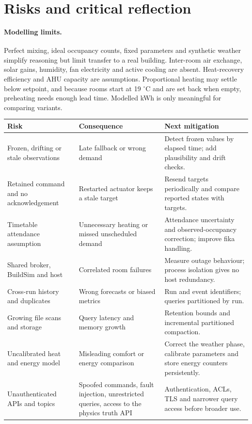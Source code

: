 \documentclass[11pt,a4paper]{article}
\begin{document}
\section{Risks and critical reflection}\label{sec:risks}
\paragraph{Modelling limits.}
Perfect mixing, ideal occupancy counts, fixed parameters and synthetic weather simplify reasoning but limit transfer to a real building. Inter-room air exchange, solar gains, humidity, fan electricity and active cooling are absent. Heat-recovery efficiency and AHU capacity are assumptions. Proportional heating may settle below setpoint, and because rooms start at 19 $^\circ$C and are set back when empty, preheating needs enough lead time. Modelled kWh is only meaningful for comparing variants.

{\small\begin{longtable}{>{\raggedright\arraybackslash}p{36mm}>{\raggedright\arraybackslash}p{52mm}>{\raggedright\arraybackslash}p{56mm}}\toprule Risk & Consequence & Next mitigation\\\midrule\endhead
Frozen, drifting or stale observations & Late fallback or wrong demand & Detect frozen values by elapsed time; add plausibility and drift checks.\\
Retained command and no acknowledgement & Restarted actuator keeps a stale target & Resend targets periodically and compare reported states with targets.\\
Timetable attendance assumption & Unnecessary heating or missed unscheduled demand & Attendance uncertainty and observed-occupancy correction; improve fika handling.\\
Shared broker, BuildSim and host & Correlated room failures & Measure outage behaviour; process isolation gives no host redundancy.\\
Cross-run history and duplicates & Wrong forecasts or biased metrics & Run and event identifiers; queries partitioned by run.\\
Growing file scans and storage & Query latency and memory growth & Retention bounds and incremental partitioned compaction.\\
Uncalibrated heat and energy model & Misleading comfort or energy comparison & Correct the weather phase, calibrate parameters and store energy counters persistently.\\
Unauthenticated APIs and topics & Spoofed commands, fault injection, unrestricted queries, access to the physics truth API & Authentication, ACLs, TLS and narrower query access before broader use.\\\bottomrule\end{longtable}}
\end{document}
